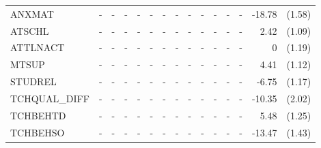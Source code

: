 \documentclass[10pt]{article}
\begin{document}
\begin{table}[htbp]
\begin{tabular}{lrlrlrlrlrlrlrl}
ANXMAT & \multicolumn{1}{c}{-} & \multicolumn{1}{c}{-} & \multicolumn{1}{c}{-} & \multicolumn{1}{c}{-} & \multicolumn{1}{c}{-} & \multicolumn{1}{c}{-} & \multicolumn{1}{c}{-} & \multicolumn{1}{c}{-} & \multicolumn{1}{c}{-} & \multicolumn{1}{c}{-} & \multicolumn{1}{c}{-} & \multicolumn{1}{c}{-} & -18.78 & (1.58) \\[0.2em]
ATSCHL & \multicolumn{1}{c}{-} & \multicolumn{1}{c}{-} & \multicolumn{1}{c}{-} & \multicolumn{1}{c}{-} & \multicolumn{1}{c}{-} & \multicolumn{1}{c}{-} & \multicolumn{1}{c}{-} & \multicolumn{1}{c}{-} & \multicolumn{1}{c}{-} & \multicolumn{1}{c}{-} & \multicolumn{1}{c}{-} & \multicolumn{1}{c}{-} & 2.42  & (1.09) \\[0.2em]
ATTLNACT & \multicolumn{1}{c}{-} & \multicolumn{1}{c}{-} & \multicolumn{1}{c}{-} & \multicolumn{1}{c}{-} & \multicolumn{1}{c}{-} & \multicolumn{1}{c}{-} & \multicolumn{1}{c}{-} & \multicolumn{1}{c}{-} & \multicolumn{1}{c}{-} & \multicolumn{1}{c}{-} & \multicolumn{1}{c}{-} & \multicolumn{1}{c}{-} & 0     & (1.19) \\[0.2em]
MTSUP & \multicolumn{1}{c}{-} & \multicolumn{1}{c}{-} & \multicolumn{1}{c}{-} & \multicolumn{1}{c}{-} & \multicolumn{1}{c}{-} & \multicolumn{1}{c}{-} & \multicolumn{1}{c}{-} & \multicolumn{1}{c}{-} & \multicolumn{1}{c}{-} & \multicolumn{1}{c}{-} & \multicolumn{1}{c}{-} & \multicolumn{1}{c}{-} & 4.41  & (1.12) \\[0.2em]
STUDREL & \multicolumn{1}{c}{-} & \multicolumn{1}{c}{-} & \multicolumn{1}{c}{-} & \multicolumn{1}{c}{-} & \multicolumn{1}{c}{-} & \multicolumn{1}{c}{-} & \multicolumn{1}{c}{-} & \multicolumn{1}{c}{-} & \multicolumn{1}{c}{-} & \multicolumn{1}{c}{-} & \multicolumn{1}{c}{-} & \multicolumn{1}{c}{-} & -6.75 & (1.17) \\[0.2em]
TCHQUAL\_DIFF & \multicolumn{1}{c}{-} & \multicolumn{1}{c}{-} & \multicolumn{1}{c}{-} & \multicolumn{1}{c}{-} & \multicolumn{1}{c}{-} & \multicolumn{1}{c}{-} & \multicolumn{1}{c}{-} & \multicolumn{1}{c}{-} & \multicolumn{1}{c}{-} & \multicolumn{1}{c}{-} & \multicolumn{1}{c}{-} & \multicolumn{1}{c}{-} & -10.35 & (2.02) \\[0.2em]
TCHBEHTD & \multicolumn{1}{c}{-} & \multicolumn{1}{c}{-} & \multicolumn{1}{c}{-} & \multicolumn{1}{c}{-} & \multicolumn{1}{c}{-} & \multicolumn{1}{c}{-} & \multicolumn{1}{c}{-} & \multicolumn{1}{c}{-} & \multicolumn{1}{c}{-} & \multicolumn{1}{c}{-} & \multicolumn{1}{c}{-} & \multicolumn{1}{c}{-} & 5.48  & (1.25) \\[0.2em]
TCHBEHSO & \multicolumn{1}{c}{-} & \multicolumn{1}{c}{-} & \multicolumn{1}{c}{-} & \multicolumn{1}{c}{-} & \multicolumn{1}{c}{-} & \multicolumn{1}{c}{-} & \multicolumn{1}{c}{-} & \multicolumn{1}{c}{-} & \multicolumn{1}{c}{-} & \multicolumn{1}{c}{-} & \multicolumn{1}{c}{-} & \multicolumn{1}{c}{-} & -13.47 & (1.43) \\[0.2em]

\end{tabular}
\end{table}
\end{document}
